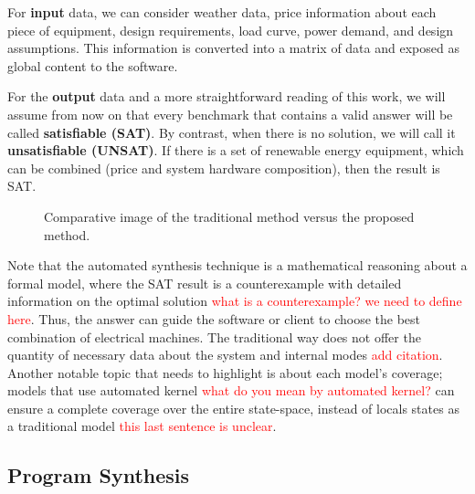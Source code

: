 \documentclass[10pt,journal,compsoc]{IEEEtran}
\begin{document}
For \textbf{input} data, we can consider weather data, price information about each piece of equipment, design requirements, load curve, power demand, and design assumptions. This information is converted into a matrix of data and exposed as global content to the software.

For the \textbf{output} data and a more straightforward reading of this work, we will assume from now on that every benchmark that contains a valid answer will be called \textbf{satisfiable (SAT)}. By contrast, when there is no solution, we will call it \textbf{unsatisfiable (UNSAT)}. If there is a set of renewable energy equipment, which can be combined (price and system hardware composition), then the result is SAT.
%
\begin{figure}[h]
\centering
\caption{Comparative image of the traditional method versus the proposed method.}
\label{fig:optimization}
\end{figure}
  
Note that the automated synthesis technique is a mathematical reasoning about a formal model, where the SAT result is a counterexample with detailed information on the optimal solution \textcolor{red}{what is a counterexample? we need to define here}. Thus, the answer can guide the software or client to choose the best combination of electrical machines. The traditional way does not offer the quantity of necessary data about the system and internal modes \textcolor{red}{add citation}. Another notable topic that needs to highlight is about each model's coverage; models that use automated kernel \textcolor{red}{what do you mean by automated kernel?} can ensure a complete coverage over the entire state-space, instead of locals states as a traditional model \textcolor{red}{this last sentence is unclear}. 

\subsection{Program Synthesis}
\label{sec:ProgramSynthesis}
\end{document}
